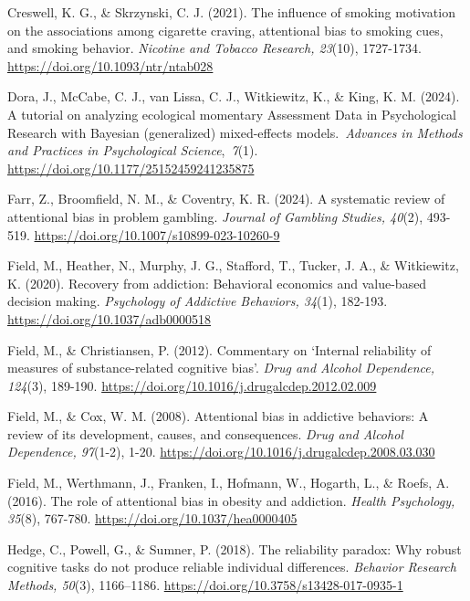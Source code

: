 \documentclass[authordate, empirical]{jote-new-article}
\begin{document}
	Creswell, K. G., \& Skrzynski, C. J. (2021). The influence of smoking motivation on the associations among cigarette craving, attentional bias to smoking cues, and smoking behavior. \emph{Nicotine and Tobacco Research, 23}(10), 1727-1734. \url{https://doi.org/10.1093/ntr/ntab028}



	Dora, J., McCabe, C. J., van Lissa, C. J., Witkiewitz, K., \& King, K. M. (2024). A tutorial on analyzing ecological momentary Assessment Data in Psychological Research with Bayesian (generalized) mixed-effects models. \emph{Advances in Methods and Practices in Psychological Science}, \emph{7}(1). \url{https://doi.org/10.1177/25152459241235875}



	Farr, Z., Broomfield, N. M., \& Coventry, K. R. (2024). A systematic review of attentional bias in problem gambling. \emph{Journal of Gambling Studies, 40}(2), 493-519. \url{https://doi.org/10.1007/s10899-023-10260-9}



	Field, M., Heather, N., Murphy, J. G., Stafford, T., Tucker, J. A., \& Witkiewitz, K. (2020). Recovery from addiction: Behavioral economics and value-based decision making. \emph{Psychology of Addictive Behaviors, 34}(1), 182-193. \url{https://doi.org/10.1037/adb0000518}



	Field, M., \& Christiansen, P. (2012). Commentary on ‘Internal reliability of measures of substance-related cognitive bias'. \emph{Drug and Alcohol Dependence, 124}(3), 189-190. \url{https://doi.org/10.1016/j.drugalcdep.2012.02.009}



	Field, M., \& Cox, W. M. (2008). Attentional bias in addictive behaviors: A review of its development, causes, and consequences. \emph{Drug and Alcohol Dependence, 97}(1-2), 1-20. \url{https://doi.org/10.1016/j.drugalcdep.2008.03.030}



	Field, M., Werthmann, J., Franken, I., Hofmann, W., Hogarth, L., \& Roefs, A. (2016). The role of attentional bias in obesity and addiction. \emph{Health Psychology, 35}(8), 767-780. \url{https://doi.org/10.1037/hea0000405}



	Hedge, C., Powell, G., \& Sumner, P. (2018). The reliability paradox: Why robust cognitive tasks do not produce reliable individual differences. \emph{Behavior Research Methods, 50}(3), 1166--1186. \url{https://doi.org/10.3758/s13428-017-0935-1}
\end{document}

